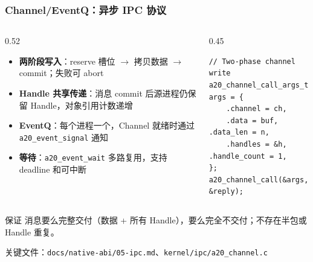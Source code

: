 \documentclass[aspectratio=1610]{beamer}
\newcommand{\code}[1]{\texttt{\footnotesize #1}}
\begin{document}
\begin{frame}[fragile]
    \frametitle{Channel/EventQ：异步 IPC 协议}
    \begin{columns}
        \begin{column}{0.52\textwidth}
            \footnotesize
            \begin{itemize}
                \item \textbf{两阶段写入}：reserve 槽位 $\rightarrow$ 拷贝数据 $\rightarrow$ commit；失败可 abort
                \item \textbf{Handle 共享传递}：消息 commit 后源进程仍保留 Handle，对象引用计数递增
                \item \textbf{EventQ}：每个进程一个，Channel 就绪时通过 \code{a20\_event\_signal} 通知
                \item \textbf{等待}：\code{a20\_event\_wait} 多路复用，支持 deadline 和可中断
            \end{itemize}
        \end{column}
        \begin{column}{0.45\textwidth}
            \begin{lstlisting}[basicstyle=\ttfamily\tiny]
// Two-phase channel write
a20_channel_call_args_t args = {
    .channel = ch,
    .data = buf, .data_len = n,
    .handles = &h, .handle_count = 1,
};
a20_channel_call(&args, &reply);
            \end{lstlisting}
        \end{column}
    \end{columns}
    \vspace{0.3em}
    \begin{block}{保证}
        \footnotesize
        消息要么完整交付（数据 + 所有 Handle），要么完全不交付；不存在半包或 Handle 重复。
    \end{block}
    \small 关键文件：\code{docs/native-abi/05-ipc.md}、\code{kernel/ipc/a20\_channel.c}
\end{frame}
\end{document}
